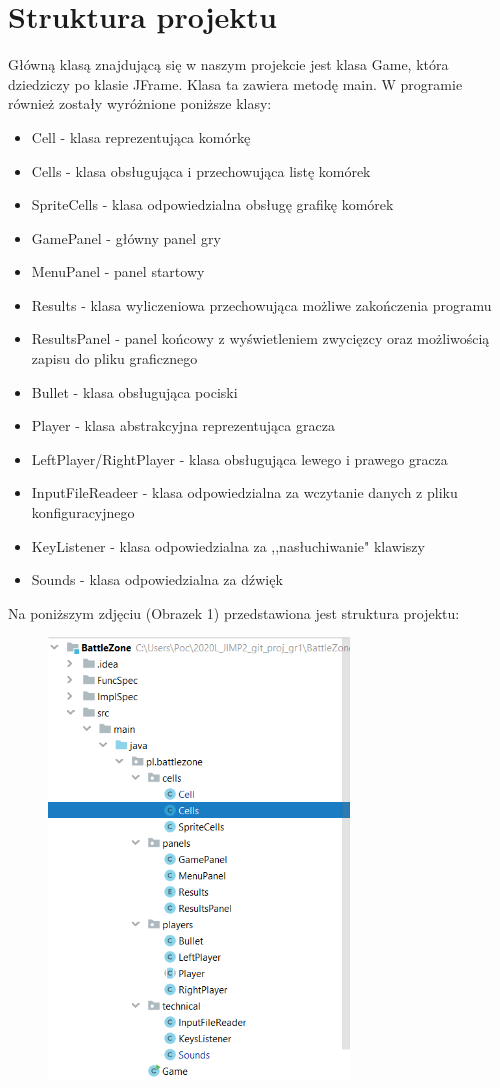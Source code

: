 \documentclass{article}
\begin{document}
\section{Struktura projektu}
Główną klasą znajdującą się w naszym projekcie jest klasa Game, która dziedziczy po klasie JFrame. Klasa ta zawiera metodę main.
W programie również zostały wyróżnione poniższe klasy:
\begin{itemize}
\item Cell - klasa reprezentująca komórkę
\item Cells - klasa obsługująca i przechowująca listę komórek
\item SpriteCells - klasa odpowiedzialna obsługę grafikę komórek
\item GamePanel - główny panel gry
\item MenuPanel - panel startowy
\item Results - klasa wyliczeniowa przechowująca możliwe zakończenia programu
\item ResultsPanel - panel końcowy z wyświetleniem zwycięzcy oraz możliwością zapisu do pliku graficznego
\item Bullet - klasa obsługująca pociski
\item Player - klasa abstrakcyjna reprezentująca gracza
\item LeftPlayer/RightPlayer - klasa obsługująca lewego i prawego gracza
\item InputFileReadeer - klasa odpowiedzialna za wczytanie danych z pliku konfiguracyjnego
\item KeyListener - klasa odpowiedzialna za ,,nasłuchiwanie" klawiszy 
\item Sounds - klasa odpowiedzialna za dźwięk

\end{itemize}
Na poniższym zdjęciu (Obrazek 1) przedstawiona jest struktura projektu:

\begin{figure} [hbt!]
    \centering
    \includegraphics[width=8cm]{Struktura_projektu.png}
\end{figure}
\end{document}
